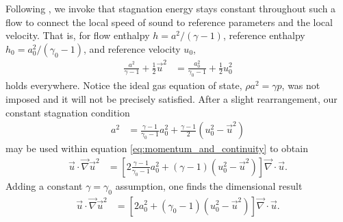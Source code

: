 \documentclass[letterpaper,11pt,nointlimits,reqno]{amsart}
\begin{document}
Following \citeauthor{Saad2011Coordinate}, we invoke that stagnation energy
stays constant throughout such a flow to connect the local speed of sound to
reference parameters and the local velocity.  That is, for flow enthalpy $h =
a^2 / \left(\gamma-1\right)$, reference enthalpy $h_0 = a_0^2 /
\left(\gamma_0-1\right)$, and reference velocity $u_0$,
\begin{align}
        \frac{a^2  }{\gamma  -1} + \frac{1}{2} \vec{u}^2
     &= \frac{a_0^2}{\gamma_0-1} + \frac{1}{2} u_0^2
\end{align}
holds everywhere.  Notice the ideal gas equation of state, $\rho a^2 = \gamma
p$, was not imposed and it will not be precisely satisfied.  After a slight
rearrangement, our constant stagnation condition
\begin{align}
        a^2
     &=   \frac{\gamma-1}{\gamma_0-1} a_0^2
        + \frac{\gamma-1}{2} \left(u_0^2 - \vec{u}^2\right)
\label{eq:stagnation_sound}
\end{align}
may be used within equation \eqref{eq:momentum_and_continuity} to obtain
\begin{align}
       \vec{u}\cdot \vec{\nabla}\vec{u}^2
    &= \left[
          2 \frac{\gamma-1}{\gamma_0-1} a_0^2
        + \left(\gamma-1\right) \left(u_0^2 - \vec{u}^2\right)
       \right]\vec{\nabla}\cdot\vec{u}
.
\end{align}
Adding a constant $\gamma=\gamma_0$ assumption, one finds the dimensional result
\begin{align}
       \vec{u}\cdot \vec{\nabla}\vec{u}^2
    &= \left[
          2 a_0^2
        + \left(\gamma_0-1\right) \left(u_0^2 - \vec{u}^2\right)
       \right]\vec{\nabla}\cdot\vec{u}
\label{eq:cpfgibbs_dim}
.
\end{align}
\end{document}
